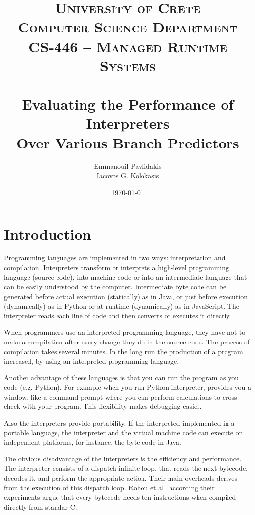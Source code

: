 \documentclass[parskip=full, paper=a4, fontsize=12pt]{scrartcl}
\title{%
\normalfont \normalsize 
\textsc{University of Crete\\
Computer Science Department \\
CS-446 -- Managed Runtime Systems} \\ [20pt] 
\horrule{0.5pt} \\[0.4cm]
\huge
Evaluating the Performance of Interpreters\\Over Various Branch Predictors
\horrule{2pt} \\[0.5cm] 
}
\author{%
    Emmanouil Pavlidakis \\
    Iacovos G. Kolokasis%
    }
\date{\normalsize\today}
\numberwithin{equation}{section}
\numberwithin{figure}{section}
\numberwithin{table}{section}
\begin{document}
\maketitle 

\section{Introduction}

Programming languages are implemented in two ways: interpretation and
compilation. Interpreters transform or interprets a high-level
programming language (source code), into machine code or into an
intermediate language that can be easily understood by the computer.
Intermediate byte code can be generated before actual execution
(statically) as in Java, or just before execution (dynamically) as in
Python or at runtime (dynamically) as in JavaScript.  The interpreter
reads each line of code and then converts or executes it directly. 

When programmers use an interpreted programming language, they have
not to make a compilation after every change they do in the source
code.  The process of compilation takes several minutes. In the long
run the production of a program increased, by using an interpreted
programming language. 

Another advantage of these languages is that you can run the program
as you code (e.g. Python). For example when you run Python
interpreter, provides you a window, like a command prompt where you
can perform calculations to cross check with your program. This
flexibility makes debugging easier. 

Also the interpreters provide portability. If the interpreted
implemented in a portable language, the interpreter and the virtual
machine code can execute on independent platforms, for instance, the
byte code in Java.

The obvious disadvantage of the interpreters is the efficiency and
performance.  The interpreter consists of a dispatch infinite loop,
that reads the next bytecode, decodes it, and perform the appropriate
action. Their main overheads derives from the execution of this
dispatch loop. Rohou et al~\cite{performance_of_interpreters}
according their experiments argue that every bytecode needs ten
instructions when compiled directly from standar C.
\end{document}
